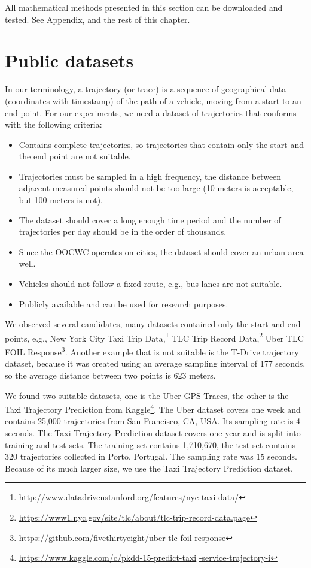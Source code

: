 \documentclass[b5paper,12pt]{report}
\theoremstyle{definition}
\begin{document}
All mathematical methods presented in this section can be downloaded and tested. See Appendix, \cite[model-sources/Markovkernel subfolder]{csts-repo} and the rest of this chapter.

\section{Public datasets}
\label{public-dataset}

In our terminology, a trajectory (or trace) is a sequence of geographical data (coordinates with timestamp) of the path of a vehicle, moving from a start to an end point. For our experiments, we need a dataset of trajectories that conforms with the following criteria:

\begin{itemize}
\item Contains complete trajectories, so trajectories that contain only the start and the end point are not suitable.
\item Trajectories must be sampled in a high frequency, the distance between adjacent measured points should not be too large (10 meters is acceptable, but 100 meters is not).
\item The dataset should cover a long enough time period and the number of trajectories per day should be in the order of thousands.
\item Since the OOCWC operates on cities, the dataset should cover an urban area well.
\item Vehicles should not follow a fixed route, e.g., bus lanes are not suitable.
\item Publicly available and can be used for research purposes.
\end{itemize}

We observed several candidates, many datasets contained only the start and end points, e.g., New York City Taxi Trip Data,\footnote{\url{http://www.datadrivenstanford.org/features/nyc-taxi-data/}} TLC Trip Record Data,\footnote{\url{https://www1.nyc.gov/site/tlc/about/tlc-trip-record-data.page}} Uber TLC FOIL Response\footnote{\url{https://github.com/fivethirtyeight/uber-tlc-foil-response}}. Another example that is not suitable is the T-Drive trajectory dataset, because it was created using an average sampling interval of 177 seconds, so the average distance between two points is 623 meters.

We found two suitable datasets, one is the Uber GPS Traces, the other is the Taxi Trajectory Prediction from Kaggle\footnote{\url{https://www.kaggle.com/c/pkdd-15-predict-taxi} \url{-service-trajectory-i}}. The Uber dataset covers one week and contains 25,000 trajectories from San Francisco, CA, USA. Its sampling rate is 4 seconds. The Taxi Trajectory Prediction dataset covers one year and is split into training and test sets. The training set contains 1,710,670, the test set contains 320 trajectories collected in Porto, Portugal. The sampling rate was 15 seconds. Because of its much larger size, we use the Taxi Trajectory Prediction dataset.
\end{document}
